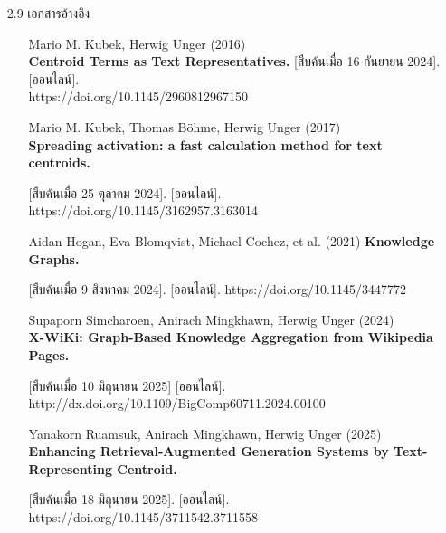 \documentclass[12pt,a4paper]{article}
\newcommand{\textlight}[1]{{\thailightfont #1}}
\begin{document}
\begin{enumerate}[leftmargin=2cm]
    \vspace{10cm}

    \item[2.9] เอกสารอ้างอิง
    \\
    \textlight{
        \begin{enumerate}
            \item[] Mario M. Kubek, Herwig Unger (2016) \\
            \textbf{Centroid Terms as Text Representatives.}
            [สืบค้นเมื่อ 16 กันยายน 2024]. [ออนไลน์]. \\ https://doi.org/10.1145/2960812967150

            \item[] Mario M. Kubek, Thomas Böhme, Herwig Unger (2017) \\
            \textbf{Spreading activation: a fast calculation method for text centroids.}

            [สืบค้นเมื่อ 25 ตุลาคม 2024]. [ออนไลน์]. https://doi.org/10.1145/3162957.3163014

            \item[] Aidan Hogan, Eva Blomqvist, Michael Cochez, et al. (2021)
            \textbf{Knowledge Graphs.}
            
            [สืบค้นเมื่อ 9 สิงหาคม 2024]. [ออนไลน์]. https://doi.org/10.1145/3447772

            \item[] Supaporn Simcharoen, Anirach Mingkhawn, Herwig Unger (2024) \\
            \textbf{X-WiKi: Graph-Based Knowledge Aggregation from Wikipedia Pages.}
            
            [สืบค้นเมื่อ 10 มิถุนายน 2025] [ออนไลน์]. http://dx.doi.org/10.1109/BigComp60711.2024.00100

            \item[] Yanakorn Ruamsuk, Anirach Mingkhawn, Herwig Unger (2025) \\
            \textbf{Enhancing Retrieval-Augmented Generation Systems by Text-Representing Centroid.}
            
            [สืบค้นเมื่อ 18 มิถุนายน 2025]. [ออนไลน์]. https://doi.org/10.1145/3711542.3711558
        \end{enumerate}
    }

    \vspace{14cm}


\end{enumerate}
\end{document}
